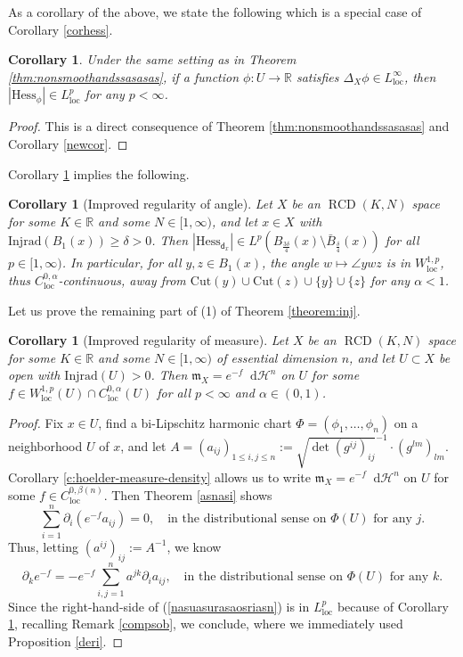 \documentclass[11pt,reqno]{amsart}
\newtheorem{corollary}[theorem]{Corollary}
\theoremstyle{definition}
\numberwithin{equation}{section}
\newcommand{\di}{\mathop{}\!\mathrm{d}}
\newcommand{\meas}{\mathfrak{m}}
\DeclareMathOperator{\dist}{\mathsf{d}}
\DeclareMathOperator{\loc}{loc}
\DeclareMathOperator{\RCD}{RCD}
\newcommand{\haus}{\mathscr{H}}
\begin{document}
As a corollary of the above, we state the following which is a special case of Corollary \ref{corhess}.
\begin{corollary}\label{corhess1}
    Under the same setting as in Theorem \ref{thm:nonsmoothandssasasas}, if a function $\phi:U \to \mathbb{R}$ satisfies $\Delta_X \phi \in L^{\infty}_{\loc}$, then $|\mathrm{Hess}_{\phi}| \in L^p_{\loc}$ for any $p<\infty$.
\end{corollary}
\begin{proof}
    This is a direct consequence of Theorem \ref{thm:nonsmoothandssasasas} and Corollary \ref{newcor}.
\end{proof}
Corollary \ref{corhess1} implies the following.
\begin{corollary}[Improved regularity of angle]\label{corangleimprove}
    Let $X$ be an $\RCD(K, N)$ space for some $K \in \mathbb{R}$ and some $N \in [1, \infty)$, and let $x \in X$ with $\mathrm{Injrad}(B_1(x))\ge \delta>0$. Then 
    $
        |\mathrm{Hess}_{\dist_x}| \in L^p(B_{\frac{3\delta}{4}}(x)\setminus \bar B_{\frac{\delta}{4}}(x))$ for all $p \in [1, \infty)$.
    In particular, for all $y, z \in B_1(x)$, the angle $w \mapsto \angle yw z$ is in $W^{1,p}_{\loc}$, thus $C^{0,\alpha}_{\loc}$-continuous, away from $\mathrm{Cut}(y)\cup \mathrm{Cut}(z) \cup \{y\} \cup \{z\}$ for any $\alpha <1$.
\end{corollary}
Let us prove the remaining part of (1) of Theorem \ref{theorem:inj}.
\begin{corollary}[Improved regularity of measure]\label{corimprovedmeas}
    Let $X$ be an $\RCD(K, N)$ space for some $K \in \mathbb{R}$ and some $N \in [1, \infty)$ of essential dimension $n$, and let $U\subset X$ be open with $\mathrm{Injrad}(U)>0$. Then 
    $\meas_X=e^{-f}\di \haus^n$ on $U$ for some $f \in W^{1,p}_{\loc}(U)\cap C^{0,\alpha}_{\loc}(U)$ for all $p<\infty$ and $\alpha \in (0,1)$.
\end{corollary}
\begin{proof}
    Fix $x \in U$, find a bi-Lipschitz harmonic chart $\Phi=(\phi_1,\ldots, \phi_n)$ on a neighborhood $U$ of $x$, and let 
     $
    A =(a_{ij})_{1\leq i,j\leq n}:= \sqrt{\det(g^{ij})_{ij}}^{-1} \cdot (g^{lm})_{lm}   
    $.
    Corollary \ref{c:hoelder-measure-density} allows us to write $
    \meas_X=e^{-f}\di \haus^n$ on $U$ for some $f \in C^{0,\beta(n)}_{\loc}$. Then Theorem \ref{asnasi} shows
    \begin{equation}
        \sum_{i=1}^n\partial_i(e^{-f} a_{ij})=0,\quad \text{in the distributional sense on $\Phi(U)$ for any $j$.}
    \end{equation}
    Thus,     letting $(a^{ij})_{ij} := A^{-1}$,  we know
    \begin{equation}\label{nasuasurasaosriasn}
        \partial_ke^{-f}=-e^{-f}\sum_{i, j=1}^n a^{jk} \partial_i a_{ij},\quad \text{in the distributional sense on $\Phi(U)$ for any $k$.}
    \end{equation}
    Since the right-hand-side of (\ref{nasuasurasaosriasn}) is in $L^p_{\loc}$ because of Corollary \ref{corhess1}, recalling Remark \ref{compsob}, we conclude, where we immediately used Proposition \ref{deri}.
\end{proof}
\end{document}
